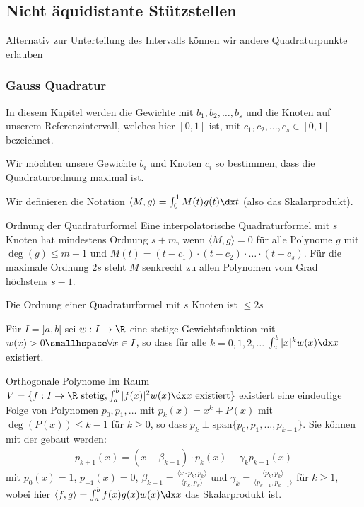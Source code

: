 \newsection
\subsection{Nicht äquidistante Stützstellen}
Alternativ zur Unterteilung des Intervalls können wir andere Quadraturpunkte erlauben

\subsubsection{Gauss Quadratur}
In diesem Kapitel werden die Gewichte mit $b_1, b_2, \ldots, b_s$ und die Knoten auf unserem Referenzintervall,
welches hier $[0, 1]$ ist, mit $c_1, c_2, \ldots, c_s \in [0, 1]$ bezeichnet.

Wir möchten unsere Gewichte $b_i$ und Knoten $c_i$ so bestimmen, dass die Quadraturordnung maximal ist.

Wir definieren die Notation $\langle M, g \rangle = \int_{0}^{1} M(t) g(t) \dx t$ (also das Skalarprodukt).

\begin{theorem}[]{Ordnung der Quadraturformel}
    Eine interpolatorische Quadraturformel mit $s$ Knoten hat mindestens Ordnung $s + m$, wenn $\langle M, g \rangle = 0$ für alle Polynome $g$ mit $\deg(g) \leq m - 1$ und
    $M(t) = (t - c_1) \cdot (t - c_2) \cdot \ldots \cdot (t - c_s)$. Für die maximale Ordnung $2s$ steht $M$ senkrecht zu allen Polynomen vom Grad höchstens $s - 1$.
\end{theorem}

 Die Ordnung einer Quadraturformel mit $s$ Knoten ist $\leq 2s$



Für $I = ]a, b[$ sei $w: I \rightarrow \R$ eine stetige Gewichtsfunktion mit $w(x) > 0 \smallhspace \forall x \in I$, so dass für alle $k = 0, 1, 2, \ldots$
$\int_{a}^{b} |x|^k w(x) \dx x$ existiert.

\begin{theorem}[]{Orthogonale Polynome}
    Im Raum $V = \{ f: I \rightarrow \R \text{ stetig}, \int_{a}^{b} |f(x)|^2 w(x) \dx x \text{ existiert} \}$ existiert eine eindeutige Folge von Polynomen
    $p_0, p_1, \ldots$ mit $p_k(x) = x^k + P(x)$ mit $\deg(P(x)) \leq k - 1$ für $k \geq 0$, so dass $p_k \perp \text{span}\{ p_0, p_1, \ldots, p_{k - 1} \}$. Sie können mit der
     gebaut werden:
    \begin{align*}
        p_{k + 1}(x) = (x - \beta_{k + 1}) \cdot p_k(x) - \gamma_k p_{k - 1}(x)
    \end{align*}
    mit $p_0(x) = 1$, $p_{- 1}(x) = 0$, $\beta_{k + 1} = \frac{\langle x \cdot p_k, p_k \rangle}{\langle p_k, p_k \rangle}$
    und $\gamma_k = \frac{\langle p_k, p_k \rangle}{\langle p_{k - 1}, p_{k - 1} \rangle}$ für $k \geq 1$,
    wobei hier $\langle f, g \rangle = \int_{a}^{b} f(x) g(x) w(x) \dx x$
    das Skalarprodukt ist.
\end{theorem}


